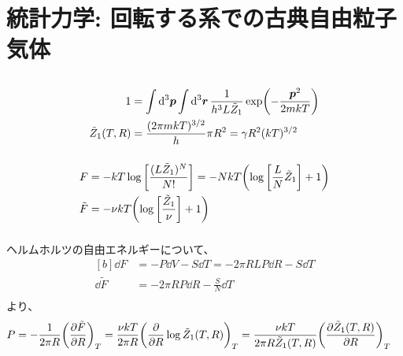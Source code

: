 \documentclass[../ap_2023.tex]{subfiles}
\begin{document}
\setcounter{chapter}{2}
\chapter{統計力学: 回転する系での古典自由粒子気体}
\section{}
\subsection{}
\begin{equation}\begin{aligned}[b]
    1 &= \int \dd[3]{\vb*{p}}\int \dd[3]{\vb*{r}} \frac{1}{h^3L\tilde{Z}_1}\exp(-\frac{\vb*{p}^2}{2mkT})\\
    \tilde{Z}_1(T,R) &= \frac{(2\pi mkT)^{3/2}}{h}\pi R^2 = \gamma R^2 (kT)^{3/2}
\end{aligned}\end{equation}

\subsection{}
\begin{equation}\begin{aligned}[b]
    F &= -kT\log \qty[\frac{(L\tilde{Z}_1)^N}{N!}] = -NkT\qty(\log\qty[\frac{L}{N}\tilde{Z}_1 ]+1)\\
    \tilde{F} & = -\nu kT\qty(\log\qty[\frac{\tilde{Z}_1}{\nu}]+1)
\end{aligned}\end{equation}

\subsection{}
ヘルムホルツの自由エネルギーについて、
\begin{equation}\begin{aligned}[b]
    \dd{F} &= -P\dd{V} -S\dd{T} = -2\pi RLP\dd{R} -S\dd{T} \\
    \dd{\tilde{F}} &=-2\pi RP\dd{R} -\frac{S}{N}\dd{T} \\
\end{aligned}\end{equation}
より、
\begin{equation}\begin{aligned}[b]
    P &= -\frac{1}{2\pi R}\qty(\pdv{\tilde{F}}{R})_{T}
        = \frac{\nu kT}{2\pi R}\qty(\pdv{R}\log \tilde{Z}_1(T,R))_{T}
        = \frac{\nu kT}{2\pi R\tilde{Z}_1(T,R)}\qty(\pdv{\tilde{Z}_1(T,R)}{R})_{T}
\end{aligned}\end{equation}
\end{document}
